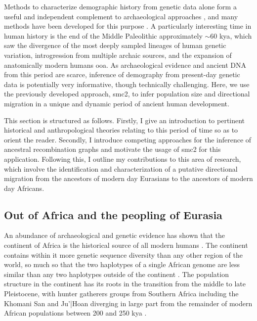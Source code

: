 Methods to characterize demographic history from genetic data alone form a useful and independent complement to archaeological approaches \cite{Nielsen2017a}, and many methods have been developed for this purpose \cite{Li2011,Pickrell2012,Rasmussen2014,Schiffels2014,Mathieson2014,Steinrucken2015,Malaspinas2016,Chikhi2018,Speidel2019,Kelleher2019,Wang2019a,Albers2019}. 
A particularly interesting time in human history is the end of the Middle Paleolithic approximately $\sim$60 \gls{kya}, which saw the divergence of the most deeply sampled lineages of human genetic variation, introgression from multiple archaic sources, and the expansion of anatomically modern humans \gls{ooa}. 
As archaeological evidence and ancient DNA from this period are scarce, inference of demography from present-day genetic data is potentially very informative, though technically challenging. Here, we use the previously developed approach, \gls{smc2}, to infer population size and directional migration in a unique and dynamic period of ancient human development.

This section is structured as follows. Firstly, I give an introduction to pertinent historical and anthropological theories relating to this period of time so as to orient the reader. Secondly, I introduce competing approaches for the inference of ancestral recombination graphs and motivate the usage of \gls{smc2} for this application. Following this, I outline my contributions to this area of research, which involve the identification and characterization of a putative directional migration from the ancestors of modern day Eurasians to the ancestors of modern day Africans. 


\subsection{Out of Africa and the peopling of Eurasia}

An abundance of archaeological and genetic evidence has shown that the continent of Africa is the historical source of all modern humans \cite{Lopez2015}. The continent contains within it more genetic sequence diversity than any other region of the world, so much so that the two haplotypes of a single African genome are less similar than any two haplotypes outside of the continent \cite{Mallick2016}. The population structure in the continent has its roots in the transition from the middle to late Pleistocene, with hunter gatherers groups from Southern Africa including the Khomani San and Ju'|Hoan diverging in large part from the remainder of modern African populations between 200 and 250 \gls{kya} \cite{Lipson2019}. 






